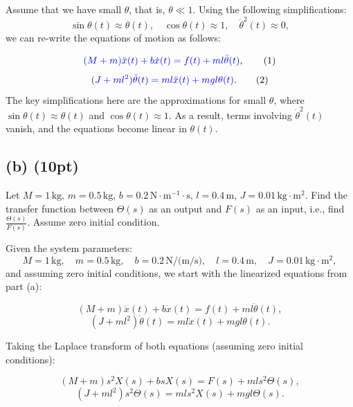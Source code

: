 \documentclass[12pt]{article}
\begin{document}
Assume that we have small \( \theta \), that is, \( \theta \ll 1 \). Using the following simplifications:
\[
\sin \theta(t) \approx \theta(t), \quad \cos \theta(t) \approx 1, \quad \dot{\theta}^2(t) \approx 0,
\]
we can re-write the equations of motion as follows:

\begin{equation*}
\textcolor{blue}{(M + m) \ddot{x}(t) + b \dot{x}(t) = f(t) + ml \ddot{\theta}(t)}, \tag{1}
\end{equation*}
\begin{equation*}
\textcolor{blue}{(J + ml^2)\ddot{\theta}(t) = ml \ddot{x}(t) + mgl \theta(t)}. \tag{2}
\end{equation*}
\noindent
The key simplifications here are the approximations for small \( \theta \), where \( \sin \theta(t) \approx \theta(t) \) and \( \cos \theta(t) \approx 1 \). As a result, terms involving \( \dot{\theta}^2(t) \) vanish, and the equations become linear in \( \theta(t) \).


\newpage
\subsection*{(b) (10pt)}
Let \( M = 1 \, \text{kg}, \, m = 0.5 \, \text{kg}, \, b = 0.2 \, \text{N} \cdot \text{m}^{-1} \cdot \text{s}, \, l = 0.4 \, \text{m}, \, J = 0.01 \, \text{kg} \cdot \text{m}^2 \). Find the transfer function between \( \Theta(s) \) as an output and \( F(s) \) as an input, i.e., find \( \frac{\Theta(s)}{F(s)} \). Assume zero initial condition.


Given the system parameters:
\[
M = 1 \, \text{kg}, \quad m = 0.5 \, \text{kg}, \quad b = 0.2 \, \text{N/(m/s)}, \quad l = 0.4 \, \text{m}, \quad J = 0.01 \, \text{kg} \cdot \text{m}^2,
\]
and assuming zero initial conditions, we start with the linearized equations from part (a):

\begin{equation*}
(M + m) \ddot{x}(t) + b \dot{x}(t) = f(t) + ml \ddot{\theta}(t), \tag{1}
\end{equation*}
\begin{equation*}
(J + ml^2)\ddot{\theta}(t) = ml \ddot{x}(t) + mgl \theta(t). \tag{2}
\end{equation*}

Taking the Laplace transform of both equations (assuming zero initial conditions):

\[
(M + m) s^2 X(s) + b s X(s) = F(s) + ml s^2 \Theta(s), \tag{3}
\]
\[
(J + ml^2) s^2 \Theta(s) = ml s^2 X(s) + mgl \Theta(s). \tag{4}
\]
\end{document}
